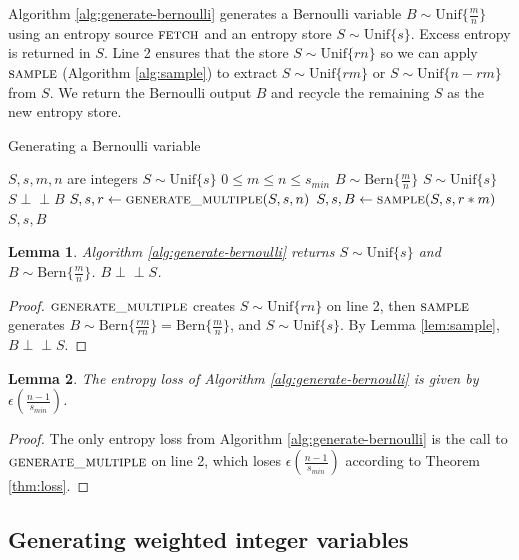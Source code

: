 \documentclass[lettersize,onecolumn]{IEEEtran}
\newtheorem{lemma}{Lemma}
\newcommand{\indep}{\perp\!\!\!\perp}
\newcommand{\unif}[1]{\mathrm{Unif}\{#1\}}
\newcommand{\bern}[1]{\mathrm{Bern}\{#1\}}
\begin{document}
Algorithm \ref{alg:generate-bernoulli} generates a Bernoulli variable $B \sim \unif{\frac{m}{n}}$ using an entropy source $\textsc{fetch}$ and an entropy store $S \sim \unif{s}$. Excess entropy is returned in $S$. Line 2 ensures that the store $S \sim \unif{rn}$ so we can apply $\textsc{sample}$ (Algorithm \ref{alg:sample}) to extract $S \sim \unif{rm}$ or $S \sim \unif{n-rm}$ from $S$. We return the Bernoulli output $B$ and recycle the remaining $S$ as the new entropy store.

\begin{algorithm}
\caption{Generating a Bernoulli variable}
\label{alg:generate-bernoulli}
\begin{algorithmic}[1]
\Require $S, s, m, n$ are integers
\Require $S \sim \unif{s}$
\Require $0 \le m \le n\le s_{min}$
\Ensure $B \sim \bern{\frac{m}{n}}$
\Ensure $S \sim \unif{s}$
\Ensure $S \indep B$
  \State $S, s, r \gets \textsc{generate\_multiple}(S, s, n)$
  \State $S, s, B \gets \textsc{sample}(S, s, r * m)$
  \State \Return $S, s, B$
\EndProcedure
\end{algorithmic}
\end{algorithm}

\begin{lemma}
Algorithm \ref{alg:generate-bernoulli} returns $S \sim \unif{s}$ and $B \sim \bern{\frac{m}{n}}$. $B \indep S$.
\end{lemma}

\begin{proof}
    $\textsc{generate\_multiple}$ creates $S \sim \unif{rn}$ on line 2, then $\textsc{sample}$ generates $B \sim \bern{\frac{rm}{rn}} = \bern{\frac{m}{n}}$, and $S \sim \unif{s}$. By Lemma \ref{lem:sample}, $B \indep S$.
\end{proof}

\begin{lemma}
The entropy loss of Algorithm \ref{alg:generate-bernoulli} is given by $\epsilon(\frac{n-1}{s_{min}})$.
\end{lemma}

\begin{proof}
    The only entropy loss from Algorithm \ref{alg:generate-bernoulli} is the call to $\textsc{generate\_multiple}$ on line 2, which loses $\epsilon(\frac{n-1}{s_{min}})$ according to Theorem \ref{thm:loss}.
\end{proof}

\subsection{Generating weighted integer variables}
\end{document}
